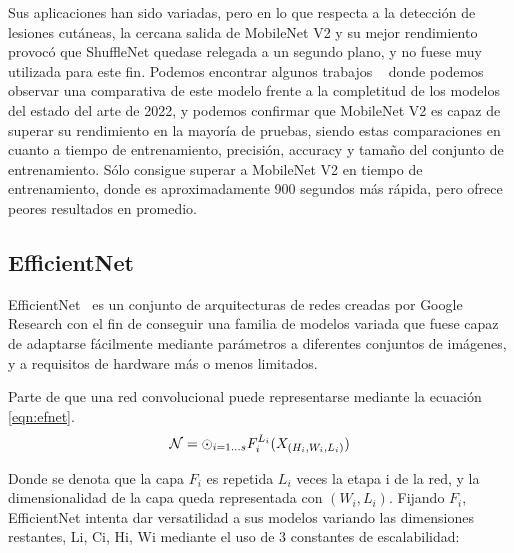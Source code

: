 Sus aplicaciones han sido variadas, pero en lo que respecta a la detección de lesiones cutáneas, la cercana salida de MobileNet V2 y su mejor rendimiento provocó que ShuffleNet quedase relegada a un segundo plano, y no fuese muy utilizada para este fin. Podemos encontrar algunos trabajos ~\cite{shuffleapp} donde podemos observar una comparativa de este modelo frente a la completitud de los modelos del estado del arte de 2022, y podemos confirmar que  MobileNet V2 es capaz de superar su rendimiento en la mayoría de pruebas, siendo estas comparaciones en cuanto a tiempo de entrenamiento, precisión, accuracy y tamaño del conjunto de entrenamiento. Sólo consigue superar a MobileNet V2 en tiempo de entrenamiento, donde es aproximadamente 900 segundos más rápida, pero ofrece peores resultados en promedio.

\subsection{EfficientNet}
\label{efnetcap}

EfficientNet~\cite{Chaturvedi_2020} es un conjunto de arquitecturas de redes creadas por Google Research con el fin de conseguir una familia de modelos variada que fuese capaz de adaptarse fácilmente mediante parámetros a diferentes conjuntos de imágenes, y a requisitos de hardware más o menos limitados. 

Parte de que una red convolucional puede representarse mediante la ecuación \ref{eqn:efnet}.
      \begin{equation}\label{eqn:efnet}
	\centering
	\mathcal{N}=\odot_{i=1...s} F_i^{L_i}(X_{(H_i, W_i,L_i)})
\end{equation}

Donde se denota que la capa $F_i$ es repetida $L_i$ veces la etapa i de la red, y la dimensionalidad de la capa queda representada con ${( W_i,L_i)}$.  Fijando $F_i$, EfficientNet intenta dar versatilidad a sus modelos variando las dimensiones restantes, Li, Ci, Hi, Wi mediante el uso de 3 constantes de escalabilidad:

